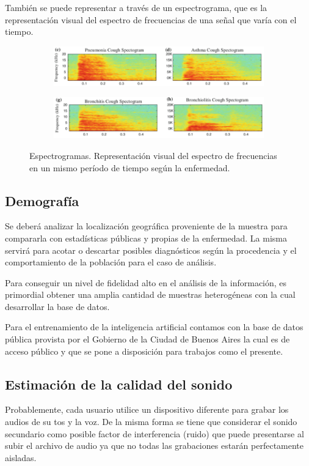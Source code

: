\documentclass[journal]{IEEEtran}
\begin{document}
También se puede representar a través de un espectrograma, que es la representación visual del espectro de frecuencias de una señal que varía con el tiempo\cite{espectrograma}.
\begin{figure}[H]
\begin{subfigure}[b]{1\columnwidth}
\includegraphics[width=\textwidth]{spectogram_pneumonia_asthma}
\end{subfigure}
\begin{subfigure}[b]{1\columnwidth}
\includegraphics[width=\textwidth]{spectogram_bronchitis_bronchiolitis}
\end{subfigure}
\caption{Espectrogramas. Representación visual del espectro de frecuencias en un mismo período de tiempo según la enfermedad.}
\end{figure}

\subsection{Demografía}
Se deberá analizar la localización geográfica proveniente de la muestra para compararla con estadísticas públicas y propias de la enfermedad. La misma servirá para acotar o descartar posibles diagnósticos según la procedencia y el comportamiento de la población para el caso de análisis.

Para conseguir un nivel de fidelidad alto en el análisis de la información, es primordial obtener una amplia cantidad de muestras heterogéneas con la cual desarrollar la base de datos\cite{tp}.

Para el entrenamiento de la inteligencia artificial contamos con la base de datos pública provista por el Gobierno de la Ciudad de Buenos Aires la cual es de acceso público y que se pone a disposición para trabajos como el presente.

\subsection{Estimación de la calidad del sonido}
Probablemente, cada usuario utilice un dispositivo diferente para grabar los audios de su tos y la voz. De la misma forma se tiene que considerar el sonido secundario como posible factor de interferencia (ruido) que puede presentarse al subir el archivo de audio ya que no todas las grabaciones estarán perfectamente aisladas.
\end{document}
